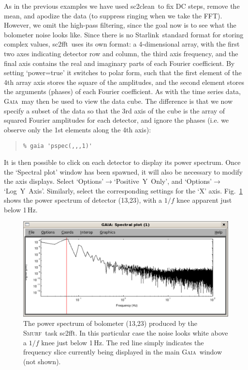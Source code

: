 \documentclass[twoside,11pt]{article}
\newenvironment{myquote}{\begin{quote}\begin{small}}{\end{small}\end{quote}}
\newcommand{\starlink}{\htmladdnormallink{Starlink}{http://starlink.jach.hawaii.edu}}
\newcommand{\gaia}{\xref{\textsc{Gaia}}{sun214}{}}
\newcommand{\smurf}{\xref{\textsc{Smurf}}{sun258}{}}
\newcommand{\task}[1]{\textsf{#1}}
\newcommand{\fft}{\xref{\task{sc2fft}}{sun258}{SC2FFT}}
\newcommand{\clean}{\xref{\task{sc2clean}}{sun258}{SC2CLEAN}}
\newcommand{\htmladdnormallink}[2]{#1}
\newcommand{\xref}[3]{#1}
\renewcommand{\_}{\texttt{\symbol{95}}}
\begin{document}
As in the previous examples we have used \clean\ to fix DC steps,
remove the mean, and apodize the data (to suppress ringing when we
take the FFT). However, we omit the high-pass filtering, since the
goal now is to see what the bolometer noise looks like. Since there is
no \starlink\ standard format for storing complex values, \fft\ uses
its own format: a 4-dimensional array, with the first two axes
indicating detector row and column, the third axis frequency, and the
final axis contains the real and imaginary parts of each Fourier
coefficient. By setting `power=true' it switches to polar form, such
that the first element of the 4th array axis stores the square of the
amplitudes, and the second element stores the arguments (phases) of
each Fourier coefficient. As with the time series data, \gaia\ may
then be used to view the data cube. The difference is that we now
specify a subset of the data so that the 3rd axis of the cube is the
array of squared Fourier amplitudes for each detector, and ignore the
phases (i.e. we observe only the 1st elements along the 4th axis):

\begin{myquote}
\begin{verbatim}
% gaia 'pspec(,,,1)'
\end{verbatim}
\end{myquote}

It is then possible to click on each detector to display its power
spectrum. Once the `Spectral plot' window has been spawned, it will
also be necessary to modify the axis displays. Select
`Options'$\rightarrow$`Positive~Y~Only', and
`Options'$\rightarrow$`Log~Y~Axis'. Similarly, select the
corresponding settings for the `X' axis. Fig.~\ref{fig:pspec} shows
the power spectrum of detector (13,23), with a $1/f$ knee apparent
just below 1\,Hz.

\begin{figure}
\begin{center}
\includegraphics[width=\linewidth]{sc19_pspec}
\caption{The power spectrum of bolometer (13,23) produced by the
  \smurf\ task \fft. In this particular case the noise looks white
  above a $1/f$ knee just below 1\,Hz. The red line simply indicates
  the frequency slice currently being displayed in the main \gaia\
  window (not shown).}
\label{fig:pspec}
\end{center}
\end{figure}
\end{document}
